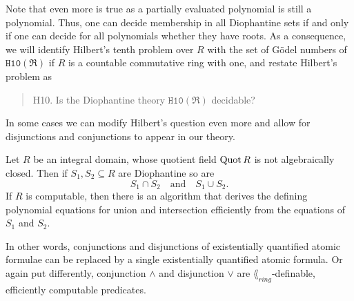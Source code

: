 Note that even more is true as a partially evaluated polynomial is still a
polynomial. Thus, one can decide membership in all Diophantine sets if and only
if one can decide for all polynomials whether they have roots. As a consequence,
we will identify Hilbert's tenth problem over \(R\) with the set of Gödel
numbers of \(\mathtt{H10}(\mathfrak{R})\) if \(R\) is a countable commutative
ring with one, and restate Hilbert's problem as
\begin{quote}
  \textsc{H10.} Is the Diophantine theory \(\mathtt{H10}(\mathfrak{R})\)
  decidable?
\end{quote}
In some cases we can modify Hilbert's question even more and allow for
disjunctions and conjunctions to appear in our theory.

\begin{lem}\label{lem:intersections and unions}
    Let \(R\) be an integral domain, whose quotient field \(\operatorname{Quot} R\) is not
    algebraically closed. Then if \(S_1, S_2 \subseteq R\) are Diophantine so
    are
    \[
      S_1 ∩ S_2 \quad \text{and} \quad S_1 ∪ S_2.
    \]
    If \(R\) is computable, then there is an algorithm that derives the defining
    polynomial equations for union and intersection efficiently from the
    equations of \(S_1\) and \(S_2\).
\end{lem}

In other words, conjunctions and disjunctions of existentially quantified atomic
formulae can be replaced by a single existentially quantified atomic formula. Or
again put differently, conjunction \(∧\) and disjunction \(∨\) are
\(\lang_{ring}\)-definable, efficiently computable predicates.

